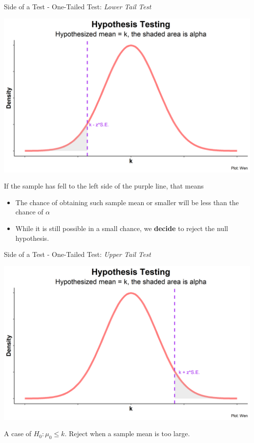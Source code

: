 \documentclass{beamer}
\begin{document}
\begin{frame}{Side of a Test - One-Tailed Test: \textit{Lower Tail Test}}

\begin{center}
\includegraphics[scale=0.4]{images/HypothesisTestingK.png}
\end{center}

If the sample has fell to the left side of the purple line, that means 
\begin{itemize}
\item The chance of obtaining such sample mean or smaller will be less than the chance of $\alpha$
\item While it is still possible in a small chance, we \textbf{decide} to reject the null hypothesis. 
\end{itemize}

\end{frame}


\begin{frame}{Side of a Test - One-Tailed Test: \textit{Upper Tail Test}}

\begin{center}
\includegraphics[scale=0.5]{images/HypothesisTestingUpperK.png}
\end{center}

A case of $H_0: \mu_0 \leq k$. Reject when a sample mean is too large.

\end{frame}
\end{document}
